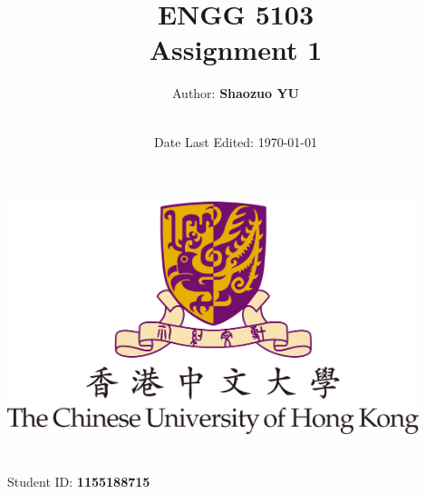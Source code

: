 \title{\Large ENGG 5103  \\[0.5cm]
        \bf\Large Assignment 1}
\author{\large Author: \bf Shaozuo YU\\ \ \\}
\date{\large Date Last Edited: \today}

\makeatletter
    \begin{titlepage}
        \begin{center}
	   { \includegraphics[width=12cm]{CUHK-logo.png}}
	   {\ \\ \ \\}
        \vbox{}\vspace{5cm}
            {\@title }\\[3cm] 
            {\@author}
            {\large Student ID: \bf 1155188715\\ \ \\}
            {\@date\\}

        \end{center}
    \end{titlepage}
\makeatother